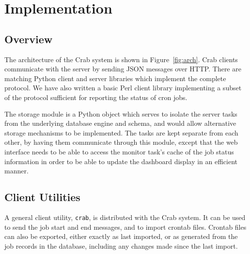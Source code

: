 \section{Implementation}

\subsection{Overview}


The architecture of the Crab system is shown in Figure~\ref{fig:arch}. Crab clients communicate with the server by sending JSON messages over HTTP. There are matching Python client and server libraries which implement the complete protocol. We have also written a basic Perl client library implementing a subset of the protocol sufficient for reporting the status of cron jobs.

The storage module is a Python object which serves to isolate the server tasks from the underlying database engine and schema, and would allow alternative storage mechanisms to be implemented. The tasks are kept separate from each other, by having them communicate through this module, except that the web interface needs to be able to access the monitor task's cache of the job status information in order to be able to update the dashboard display in an efficient manner.

\subsection{Client Utilities}


A general client utility, \texttt{crab}, is distributed with the Crab system. It can be used to send the job start and end messages, and to import crontab files. Crontab files can also be exported, either exactly as last imported, or as generated from the job records in the database, including any changes made since the last import.

